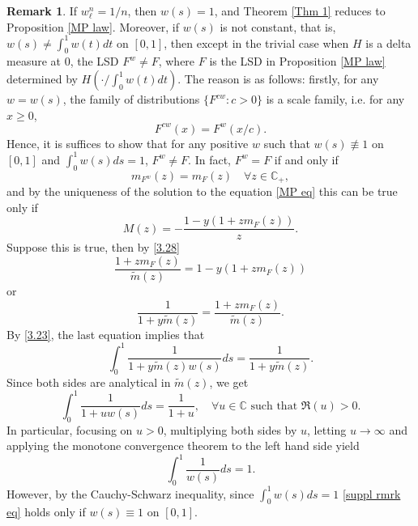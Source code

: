 \documentclass[a4paper,11pt]{book}
\theoremstyle{plain}
\theoremstyle{definition}
\newtheorem{rmrk}[thm]{Remark}
\begin{document}
    \begin{rmrk}
    	If $w_\ell^n = 1/n$, then $w(s)=1$, and Theorem \ref{Thm 1} reduces to Proposition \ref{MP law}. Moreover, if $w(s)$ is not constant, that is, $w(s) \neq \int_{0}^{1} w(t) dt$ on $[0, 1]$, then except in the trivial case when $H$ is a delta measure at $0$, the LSD $F^w \neq F$, where $F$ is the LSD in Proposition \ref{MP law} determined by $H(\cdot / \int_{0}^{1} w(t) dt)$. The reason is as follows: firstly, for any $w = w(s)$, the family of distributions	$ \{ F^{cw}:c>0  \} $ is a scale family, i.e. for any $x \geq 0$,
    	\[ F^{cw}(x) = F^w(x/c). \]
    	Hence, it is suffices to show that for any positive $w$ such that $w(s) \not\equiv 1 $ on $[0, 1]$ and $ \int_{0}^{1} w(s)ds = 1 $, $F^w \neq F$. In fact, $F^w = F$ if and only if
    	\[ m_{F^w}(z) = m_F(z) \quad \forall z \in \mathbb{C}_+, \]
    	and by the uniqueness of the solution to the equation \eqref{MP eq} this can be true only if
    	\[ M(z) = -\frac{1-y(1 + z m_F(z))}{z}. \]
    	Suppose this is true, then by \eqref{3.28}
    	\[ \frac{1+zm_F(z)}{\widetilde{m}(z)} = 1-y(1 + z m_F(z)) \]
    	or
    	\[ \frac{1}{1+y\widetilde{m}(z)}=\frac{1+zm_F(z)}{\widetilde{m}(z)}.\]
    	By \eqref{3.23}, the last equation implies that
    	\[ \int_{0}^{1} \frac{1}{1 + y \widetilde{m}(z)w(s) }ds = \frac{1}{1+y\widetilde{m}(z)}. \]
    	Since both sides are analytical in $\widetilde{m}(z)$, we get
    	\[ \int_{0}^{1} \frac{1}{1+uw(s)} ds = \frac{1}{1+u}, \quad \forall u \in \mathbb{C} \text{ such that } \Re(u)>0. \]
    	In particular, focusing on $u > 0$, multiplying both sides by $u$, letting $u \rightarrow \infty$ and applying the monotone convergence theorem to the left hand side yield
    	\begin{equation} \label{suppl rmrk eq}
    	    \int_{0}^{1} \frac{1}{w(s)}ds = 1.
    	\end{equation}
    	However, by the Cauchy-Schwarz inequality, since $\int_{0}^{1} w(s)ds = 1$ \eqref{suppl rmrk eq} holds only if $w(s) \equiv 1$ on $[0, 1]$.
    \end{rmrk}
    
\end{document}

